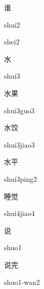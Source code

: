 \begin{verbete}[shui2]{谁}
\begin{pronuncia}{shui2}
\end{pronuncia}
\begin{pronuncia}{shei2}
\end{pronuncia}
\end{verbete}

\begin{verbete}[shui3]{水}
\begin{pronuncia}{shui3}
\end{pronuncia}
\end{verbete}

\begin{verbete}{水果}
\begin{pronuncia}{shui3guo3}
\end{pronuncia}
\end{verbete}

\begin{verbete}{水饺}
\begin{pronuncia}{shui3jiao3}
\end{pronuncia}
\end{verbete}

\begin{verbete}{水平}
\begin{pronuncia}{shui3ping2}
\end{pronuncia}
\end{verbete}

\begin{verbete}{睡觉}
\begin{pronuncia}{shui4jiao4}
\end{pronuncia}
\end{verbete}

\begin{verbete}[shuo1]{说}
\begin{pronuncia}{shuo1}
\end{pronuncia}
\end{verbete}

\begin{verbete}{说完}
\begin{pronuncia}{shuo1-wan2}
\end{pronuncia}
\end{verbete}

